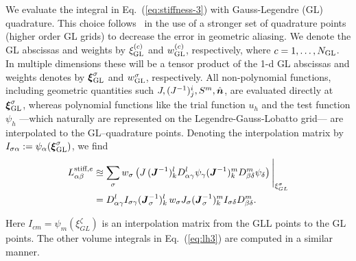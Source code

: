 We evaluate the integral in Eq.~(\ref{eq:stiffness-3}) with Gauss-Legendre (GL) quadrature.
This choice follows~\cite{mengaldo2015dealiasing} in the use of a stronger set of quadrature points
 (higher order GL grids) to decrease the error in geometric aliasing.  We denote the GL abscissas and weights by $\xi_{\rm GL}^{(c)}$ and $w_{\rm GL}^{(c)}$, respectively, where $c=1,\ldots, N_{\rm GL}$.  In multiple dimensions these will be a tensor product of the 1-d GL abscissas and weights denotes by $\boldsymbol{\xi}^\sigma_{\rm GL}$ and $w^\sigma_{\rm GL}$, respectively.  All non-polynomial functions,
including geometric quantities such $J, (J^{-1})^i_j, S^m, \Hat{\boldsymbol{n}}$, are evaluated directly at $\boldsymbol{\xi}^\sigma_{\rm GL}$, whereas polynomial functions like the trial
function $u_h$ and the test function $\psi_h$ ---which naturally are represented 
on the Legendre-Gauss-Lobatto grid--- are interpolated to
the GL--quadrature points. Denoting the interpolation matrix by $I_{\sigma\alpha}:=\psi_\alpha(\boldsymbol{\xi}^\sigma_{\rm GL})$, we find
\begin{align}
L^{\text{stiff},e}_{\alpha\beta}
      &\approxeq \sum_\sigma w_\sigma
    \left(J\,
    (\boldsymbol{J}^{-1})^l_kD^l_{\alpha\gamma}\psi_{\gamma}
    (\boldsymbol{J}^{-1})^m_kD^m_{\beta\delta}\psi_{\delta}
    \right)\Bigg|_{\xi^\sigma_{GL}} \\
    &=   D^l_{\alpha\gamma}I_{\sigma\gamma}(\boldsymbol{J}_\sigma^{-1})^l_k\, w_\sigma J_\sigma (\boldsymbol{J}_\sigma^{-1})^m_k I_{\sigma\delta} D^m_{\beta\delta}  \label{eq:harald-stiff}.
\end{align}



Here $I_{cm} = \psi_m(\xi^\zeta_{GL})$ is an interpolation matrix from
the GLL points to the GL points.
%
%
The other volume integrals in Eq.~(\ref{eq:lh3})
are computed in a similar manner.

